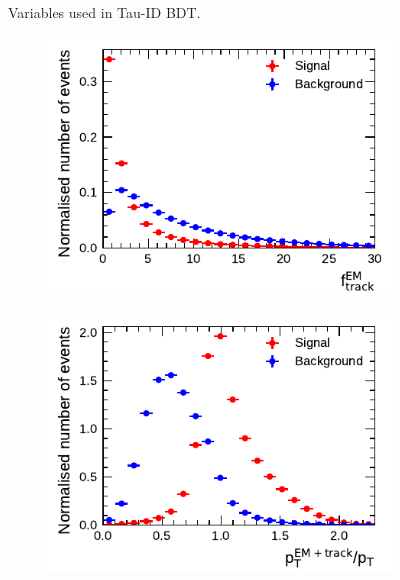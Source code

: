 \begin{figure}[!ht]
\begin{subfigure}{0.5\textwidth}
  \end{subfigure}
  \caption{Variables used in Tau-ID BDT. }
  \label{fig:bdt_vars_1p_overlays}
\end{figure}

\begin{figure}[!ht]\ContinuedFloat
  \begin{subfigure}{0.5\textwidth}
    \centering
    \includegraphics{./figures/baseline_bdt_vars/1p/EMPOverTrkSysP.pdf}
  \end{subfigure}%
  \begin{subfigure}{0.5\textwidth}
    \centering
    \includegraphics{./figures/baseline_bdt_vars/1p/ptRatioEflowApprox.pdf}
  \end{subfigure}
  \begin{subfigure}{0.5\textwidth}
    \centering

\end{subfigure}
\end{figure}

